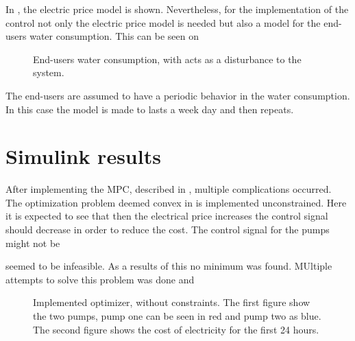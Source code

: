 In , the electric price model is shown. Nevertheless, for the implementation of the control not only the electric price model is needed but also a model for the end-users water consumption. This can be seen on 

\begin{figure}[H]
\centering
 
\caption{End-users water consumption, with acts as a disturbance to the system.}
\label{fig:water_consumption}
\end{figure}

The end-users are assumed to have a periodic behavior in the water consumption. In this case the model is made to lasts a week day and then repeats. 


\section{Simulink results}

After implementing the MPC, described in , multiple complications occurred. The optimization problem deemed convex in  is implemented unconstrained. Here it is expected to see that then the electrical price increases the control signal should decrease in order to reduce the cost. The control signal for the pumps might not be 

seemed to be infeasible. As a results of this no minimum was found. MUltiple attempts to solve this problem was done and 


\begin{figure}[H]
\centering
 
\caption{Implemented optimizer, without constraints. The first figure show the two pumps, pump one can be seen in red and pump two as blue. The second figure shows the cost of electricity for the first 24 hours.}
\label{fig:Implementation_shit}
\end{figure}


%
%
%
%
%
